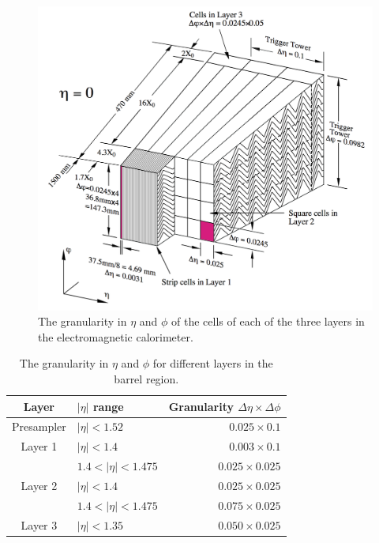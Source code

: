 \begin{figure}
\centering
\includegraphics[width=\textwidth]{data/photo/detector/ECAL.png}
\caption{The granularity in $\eta$ and $\phi$ of the cells of each of the three layers in the electromagnetic calorimeter. \cite{ATLAS_doc}}
\label{fig:ECAL}
\end{figure}

\begin{table}[htpb]
\centering
\begin{tabular}{|c|l|r|}
\hline
Layer & $|\eta|$ range & Granularity $\Delta \eta \times \Delta \phi$ \\
\hline
\hline
Presampler & $|\eta| < 1.52$         & $0.025 \times 0.1$ \\
\hline
Layer 1    & $|\eta| < 1.4$          & $0.003 \times 0.1$ \\
           & $1.4 < |\eta| < 1.475$  & $0.025 \times 0.025$ \\
\hline
Layer 2    & $|\eta| < 1.4$          & $0.025 \times 0.025$ \\
           & $1.4 < |\eta| < 1.475$  & $0.075 \times 0.025$ \\
\hline
Layer 3    & $|\eta| < 1.35$         & $0.050 \times 0.025$ \\
\hline
\end{tabular}
\caption{The granularity in $\eta$ and $\phi$ for different layers in the barrel region. \cite{ATLAS_doc}}
\label{tab:granularity_EM_barrel}
\end{table}

